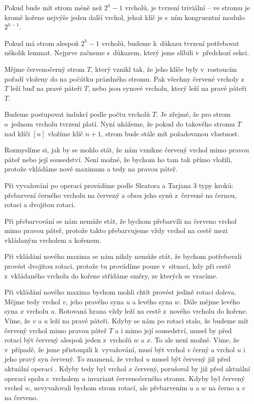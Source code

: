 \begin{dukaz}
Pokud bude mít strom méně než $2^h-1$ vrcholů, je tvrzení triviální -- ve stromu je kromě kořene nejvýše jeden další vrchol, jehož klíč je s~ním kongruentní modulo $2^{h-1}$.

Pokud má strom alespoň $2^h-1$ vrcholů, budeme k~důkazu tvrzení potřebovat několik lemmat.
Nejprve začneme s~důkazem, který jsme slíbili v~předchozí sekci.

\begin{lemma}
Mějme červenočerný strom $T$, který vznikl tak, že jeho klíče byly v~rostoucím pořadí vloženy do na počátku prázdného stromu. Pak všechny červené vrcholy z~$T$ leží buď na pravé páteři $T$, nebo jsou synové vrcholu, který leží na pravé páteři $T$.
\end{lemma}
\begin{dukaz}
Budeme postupovat indukcí podle počtu vrcholů $T$. Je zřejmé, že pro strom o~jednom vrcholu tvrzení platí. Nyní ukážeme, že pokud do takového stromu $T$ nad klíči $[n]$ vložíme klíč $n+1$, strom bude stále mít požadovanou vlastnost.

Rozmyslíme si, jak by se mohlo stát, že nám vznikne červený vrchol mimo pravou
páteř nebo její sousedství. Není možné, že bychom ho tam tak přímo vložili,
protože vkládáme nové maximum a tedy na pravou páteř.

Při vyvažování po operaci
 provádíme podle Sleatora a Tarjana \citeyearpar{splay} 3 typy kroků: přebarvení černého vrcholu na červený a obou
jeho synů z~červené na černou, rotaci a dvojitou rotaci.

Při přebarvování se nám nemůže stát, že bychom přebarvili na červeno vrchol mimo pravou páteř, protože takto přebarvujeme vždy vrchol na cestě mezi vkládaným vrcholem a kořenem.

Při vkládání nového maxima se nám nikdy nemůže stát, že bychom potřebovali provést dvojitou rotaci, protože tu provádíme pouze v~situaci, kdy při cestě z~vkládaného vrcholu do kořene střídáme směry, ze kterých se vracíme.

Při vkládání nového maxima bychom mohli chtít provést jedině rotaci doleva.
Mějme tedy vrchol $v$, jeho pravého syna $u$ a levého syna $w$. Dále mějme levého syna $x$ vrcholu $u$.
Rotovaná hrana vždy leží na cestě z~nového vrcholu do kořene. Víme, že $v$ a
$u$ leží na pravé páteři. Kdyby se nám po rotaci stalo, že budeme mít červený vrchol mimo pravou páteř $T$ a i mimo její sousedství, musel by před rotací být červený alespoň jeden z~vrcholů $w$ a $x$. To ale není možné. Víme, že v~případě, že jsme přistoupili k~vyvažování, musí být vrchol $v$ černý a vrchol $u$ i jeho pravý syn červený. To znamená, že vrchol $u$ musel být červený již před aktuální operací . Kdyby tedy byl vrchol $x$ červený, porušoval by již před aktuální operací  spolu s~vrcholem $u$ invariant červenočerného stromu. Kdyby byl červený vrchol $w$, nevyvažovali bychom strom rotací, ale přebarvením $u$ a $w$ na černo a $v$ na červeno. 
\end{dukaz}


\end{dukaz}
